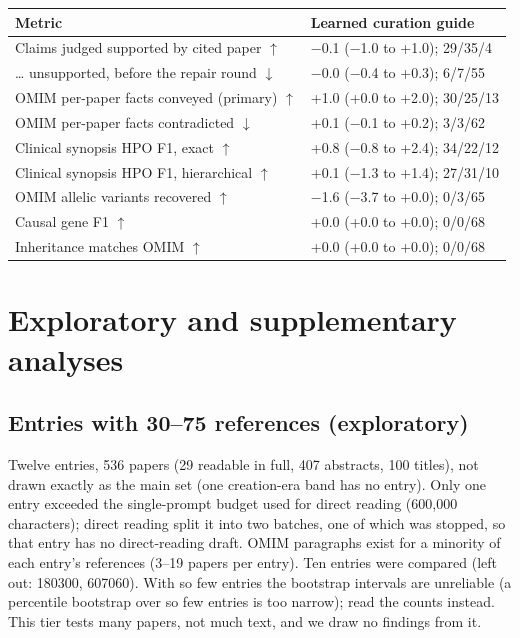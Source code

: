 \documentclass{article} %
\begin{document}
\begin{table}[!htbp]
\begin{tabularx}{\linewidth}{>{\raggedright\arraybackslash}p{5.6cm}>{\centering\arraybackslash}X}
\toprule
Metric & Learned curation guide \\
\midrule
Claims judged supported by cited paper $\uparrow$ & $-$0.1 ($-$1.0 to +1.0); 29/35/4 \\
\ldots{} unsupported, before the repair round $\downarrow$ & $-$0.0 ($-$0.4 to +0.3); 6/7/55 \\
OMIM per-paper facts conveyed (primary) $\uparrow$ & +1.0 (+0.0 to +2.0); 30/25/13 \\
OMIM per-paper facts contradicted $\downarrow$ & +0.1 ($-$0.1 to +0.2); 3/3/62 \\
Clinical synopsis HPO F1, exact $\uparrow$ & +0.8 ($-$0.8 to +2.4); 34/22/12 \\
Clinical synopsis HPO F1, hierarchical $\uparrow$ & +0.1 ($-$1.3 to +1.4); 27/31/10 \\
OMIM allelic variants recovered $\uparrow$ & $-$1.6 ($-$3.7 to +0.0); 0/3/65 \\
Causal gene F1 $\uparrow$ & +0.0 (+0.0 to +0.0); 0/0/68 \\
Inheritance matches OMIM $\uparrow$ & +0.0 (+0.0 to +0.0); 0/0/68 \\
\bottomrule
\end{tabularx}
\end{table}

\FloatBarrier
\section{Exploratory and supplementary analyses}
\FloatBarrier
\subsection{Entries with 30--75 references (exploratory)}
\label{app:large}
Twelve entries, 536 papers (29 readable in full, 407 abstracts, 100 titles), not drawn exactly as the main set (one creation-era band has no entry). Only one entry exceeded the single-prompt budget used for direct reading (600,000 characters); direct reading split it into two batches, one of which was stopped, so that entry has no direct-reading draft. OMIM paragraphs exist for a minority of each entry's references (3--19 papers per entry). Ten entries were compared (left out: 180300, 607060). With so few entries the bootstrap intervals are unreliable (a percentile bootstrap over so few entries is too narrow); read the counts instead. This tier tests many papers, not much text, and we draw no findings from it.
\end{document}
